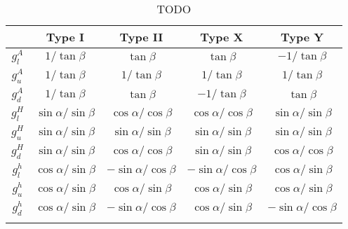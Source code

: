 \begin{table}[h]
\centering
\renewcommand{\arraystretch}{1.5} %
\setlength{\tabcolsep}{12pt} %
\begin{tabular}{|c|c|c|c|c|}
\hline
        & Type I                     & Type II                     & Type X                                        & Type Y                      \\ \hline \hline
$g_l^A$ & $1/\tan{\beta}$            & $\tan{\beta}$               & $\tan{\beta}$    & $-1/\tan{\beta}$            \\ \arrayrulecolor{lightgray} \hline
$g_u^A$ & $1/\tan{\beta}$            & $1/\tan{\beta}$             & $1/\tan{\beta}$                               & $1/\tan{\beta}$             \\ \arrayrulecolor{lightgray} \hline
$g_d^A$ & $1/\tan{\beta}$            & $\tan{\beta}$               & $-1/\tan{\beta}$                              & $\tan{\beta}$               \\ \arrayrulecolor{lightgray} \hline
$g_l^H$ & $\sin{\alpha}/\sin{\beta}$ & $\cos{\alpha}/\cos{\beta}$  & $\cos{\alpha}/\cos{\beta}$                    & $\sin{\alpha}/\sin{\beta}$  \\ \arrayrulecolor{lightgray} \hline
$g_u^H$ & $\sin{\alpha}/\sin{\beta}$ & $\sin{\alpha}/\sin{\beta}$  & $\sin{\alpha}/\sin{\beta}$                    & $\sin{\alpha}/\sin{\beta}$  \\ \arrayrulecolor{lightgray} \hline
$g_d^H$ & $\sin{\alpha}/\sin{\beta}$ & $\cos{\alpha}/\cos{\beta}$  & $\sin{\alpha}/\sin{\beta}$                    & $\cos{\alpha}/\cos{\beta}$  \\ \arrayrulecolor{lightgray} \hline
$g_l^h$ & $\cos{\alpha}/\sin{\beta}$ & $-\sin{\alpha}/\cos{\beta}$ & $-\sin{\alpha}/\cos{\beta}$                   & $\cos{\alpha}/\sin{\beta}$  \\ \arrayrulecolor{lightgray} \hline
$g_u^h$ & $\cos{\alpha}/\sin{\beta}$ & $\cos{\alpha}/\sin{\beta}$  & $\cos{\alpha}/\sin{\beta}$                    & $\cos{\alpha}/\sin{\beta}$  \\ \arrayrulecolor{lightgray} \hline
$g_d^h$ & $\cos{\alpha}/\sin{\beta}$ & $-\sin{\alpha}/\cos{\beta}$ & $\cos{\alpha}/\sin{\beta}$                    & $-\sin{\alpha}/\cos{\beta}$ \\ \arrayrulecolor{black} \hline
\end{tabular}
\caption{TODO}
\label{Table:Chapter2_2HDM-Couplings}
\end{table}

